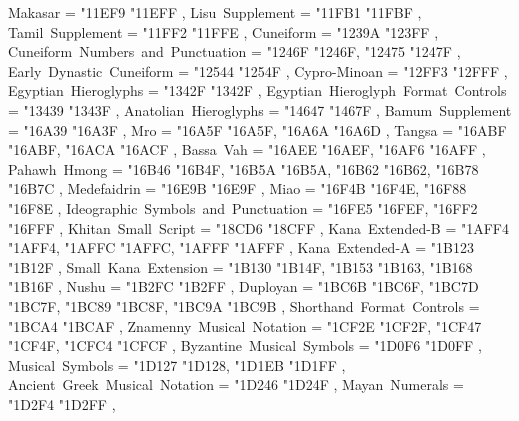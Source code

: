 {    Makasar                                        = { {"11EF9} {"11EFF} },
    Lisu~Supplement                                = { {"11FB1} {"11FBF} },
    Tamil~Supplement                               = { {"11FF2} {"11FFE} },
    Cuneiform                                      = { {"1239A} {"123FF} },
    Cuneiform~Numbers~and~Punctuation              = { {"1246F} {"1246F}, {"12475} {"1247F} },
    Early~Dynastic~Cuneiform                       = { {"12544} {"1254F} },
    Cypro-Minoan                                   = { {"12FF3} {"12FFF} },
    Egyptian~Hieroglyphs                           = { {"1342F} {"1342F} },
    Egyptian~Hieroglyph~Format~Controls            = { {"13439} {"1343F} },
    Anatolian~Hieroglyphs                          = { {"14647} {"1467F} },
    Bamum~Supplement                               = { {"16A39} {"16A3F} },
    Mro                                            = { {"16A5F} {"16A5F}, {"16A6A} {"16A6D} },
    Tangsa                                         = { {"16ABF} {"16ABF}, {"16ACA} {"16ACF} },
    Bassa~Vah                                      = { {"16AEE} {"16AEF}, {"16AF6} {"16AFF} },
    Pahawh~Hmong                                   = { {"16B46} {"16B4F}, {"16B5A} {"16B5A}, {"16B62} {"16B62}, {"16B78} {"16B7C} },
    Medefaidrin                                    = { {"16E9B} {"16E9F} },
    Miao                                           = { {"16F4B} {"16F4E}, {"16F88} {"16F8E} },
    Ideographic~Symbols~and~Punctuation            = { {"16FE5} {"16FEF}, {"16FF2} {"16FFF} },
    Khitan~Small~Script                            = { {"18CD6} {"18CFF} },
    Kana~Extended-B                                = { {"1AFF4} {"1AFF4}, {"1AFFC} {"1AFFC}, {"1AFFF} {"1AFFF} },
    Kana~Extended-A                                = { {"1B123} {"1B12F} },
    Small~Kana~Extension                           = { {"1B130} {"1B14F}, {"1B153} {"1B163}, {"1B168} {"1B16F} },
    Nushu                                          = { {"1B2FC} {"1B2FF} },
    Duployan                                       = { {"1BC6B} {"1BC6F}, {"1BC7D} {"1BC7F}, {"1BC89} {"1BC8F}, {"1BC9A} {"1BC9B} },
    Shorthand~Format~Controls                      = { {"1BCA4} {"1BCAF} },
    Znamenny~Musical~Notation                      = { {"1CF2E} {"1CF2F}, {"1CF47} {"1CF4F}, {"1CFC4} {"1CFCF} },
    Byzantine~Musical~Symbols                      = { {"1D0F6} {"1D0FF} },
    Musical~Symbols                                = { {"1D127} {"1D128}, {"1D1EB} {"1D1FF} },
    Ancient~Greek~Musical~Notation                 = { {"1D246} {"1D24F} },
    Mayan~Numerals                                 = { {"1D2F4} {"1D2FF} },
}
